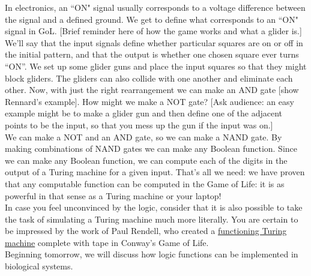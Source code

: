 \documentclass{article}
\begin{document}
In electronics, an ``ON" signal usually corresponds to a voltage difference between the signal and a defined ground. We get to define what corresponds to an ``ON" signal in GoL. [Brief reminder here of how the game works and what a glider is.] We'll say that the input signals define whether particular squares are on or off in the initial pattern, and that the output is whether one chosen square ever turns ``ON''. We set up some glider guns and place the input squares so that they might block gliders. The gliders can also collide with one another and eliminate each other. Now, with just the right rearrangement we can make an AND gate [show Rennard's example]. How might we make a NOT gate? [Ask audience: an easy example might be to make a glider gun and then define one of the adjacent points to be the input, so that you mess up the gun if the input was on.]\\

We can make a NOT and an AND gate, so we can make a NAND gate. By making combinations of NAND gates we can make any Boolean function. Since we can make any Boolean function, we can compute each of the digits in the output of a Turing machine for a given input. That's all we need: we have proven that any computable function can be computed in the Game of Life: it is as powerful in that sense as a Turing machine or your laptop! \\

In case you feel unconvinced by the logic, consider that it is also possible to take the task of simulating a Turing machine much more literally. You are certain to be impressed by the work of Paul Rendell, who created a \href{http://rendell-attic.org/gol/tm.htm}{functioning Turing machine} complete with tape in Conway's Game of Life.\\

Beginning tomorrow, we will discuss how logic functions can be implemented in biological systems.
\end{document}
